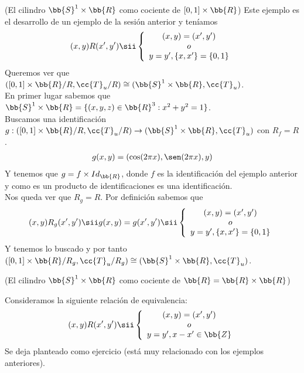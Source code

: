  \begin{ejemplo}(El cilindro $\bb{S}^1\times \bb{R}$ como cociente de $[0,1]\times \bb{R}$)
    Este ejemplo es el desarrollo de un ejemplo de la sesión anterior y teníamos
    \begin{align*}
        (x,y)R(x',y') \sii \left\{
        \begin{array}{c}
            (x,y)=(x',y')\\
            o\\
            y=y', \{x,x'\}=\{0,1\}
        \end{array}
        \right.
    \end{align*}
    Queremos ver que $([0,1]\times \bb{R}/R, \cc{T}_u/R) \cong (\bb{S}^1\times \bb{R}, \cc{T}_u)$.\\

    En primer lugar sabemos que $\bb{S}^1\times \bb{R}=\{(x,y,z)\in \bb{R}^3: x^2 + y^2 = 1\}$.\\

    Buscamos una identificación $g:([0,1]\times \bb{R}/R, \cc{T}_u/R) \to (\bb{S}^1\times \bb{R}, \cc{T}_u)$ con $R_f=R$.
    \begin{align*}
        g(x,y)=(\cos(2\pi x ), \sen(2\pi x),y)
    \end{align*}
    Y tenemos que $g=f\times Id_{\bb{R}}$, donde $f$ es la identificación del ejemplo anterior y como es un producto de identificaciones es una identificación.\\

    Nos queda ver que $R_g=R$. Por definición sabemos que 
    \begin{align*}
        (x,y)R_g(x',y') \sii g(x,y)=g(x',y') \sii \left\{
            \begin{array}{c}
                (x,y)=(x',y')\\
                o\\
                y=y', \{x,x'\}=\{0,1\}
            \end{array}
        \right.
    \end{align*}
    Y tenemos lo buscado y por tanto $([0,1]\times \bb{R}/R_g, \cc{T}_u/R_g) \cong (\bb{S}^1\times \bb{R}, \cc{T}_u)$.
    \endsquare
 \end{ejemplo}

 \begin{ejercicio}
    (El cilindro $\bb{S}^1\times \bb{R}$ como cociente de $\bb{R}=\bb{R}\times \bb{R}$)

    Consideramos la siguiente relación de equivalencia:
    \begin{align*}
        (x,y)R(x',y') \sii\left\{
            \begin{array}{c}
                (x,y)=(x',y')\\
                o\\
                y=y', x-x'\in \bb{Z}
            \end{array}
        \right.
    \end{align*}
    Se deja planteado como ejercicio (está muy relacionado con los ejemplos anteriores).
    \endsquare
 \end{ejercicio}


